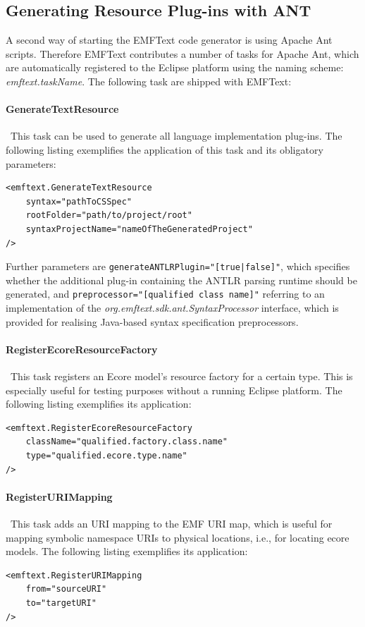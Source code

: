 	\subsection{Generating Resource Plug-ins with ANT}
	\label{sec:process_generating_ant}
	A second way of starting the EMFText code generator is using Apache Ant
	scripts. Therefore EMFText contributes a number of tasks for Apache Ant,
	which are automatically registered to the Eclipse platform using the
	naming scheme: \emph{emftext.taskName}. The following task are shipped with
	EMFText:
	
	\paragraph*{GenerateTextResource}~This task can be used to generate all
	language implementation plug-ins. The following listing exemplifies the
	application of this task and its obligatory parameters:
\begin{lstlisting}
<emftext.GenerateTextResource
	syntax="pathToCSSpec"
	rootFolder="path/to/project/root"
	syntaxProjectName="nameOfTheGeneratedProject"
/>
\end{lstlisting}
	Further parameters are \texttt{generateANTLRPlugin="[true|false]"}, which
	specifies whether the additional plug-in
	containing the ANTLR parsing runtime should be generated, and
	\texttt{pre\-processor="[qualified class name]"} referring to an implementation
	of the \emph{org.emftext.sdk.\-ant.Syntax\-Processor} interface, which is provided
	for realising Java-based syntax specification preprocessors. 
	
	\paragraph*{RegisterEcoreResourceFactory}~This task registers an Ecore
	model's resource factory for a certain type. This is especially useful for testing
	purposes without a running Eclipse platform.  
	The following listing exemplifies its application:
\begin{lstlisting}
<emftext.RegisterEcoreResourceFactory
	className="qualified.factory.class.name"
	type="qualified.ecore.type.name"
/>
\end{lstlisting}
	\paragraph*{RegisterURIMapping}~This task adds an URI mapping to the EMF URI
	map, which is useful for mapping symbolic namespace URIs to physical locations, i.e., 
	for locating ecore models. 
	The following listing exemplifies its application:
\begin{lstlisting}
<emftext.RegisterURIMapping
	from="sourceURI"
	to="targetURI"
/>
\end{lstlisting}

